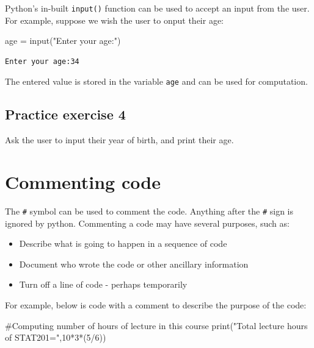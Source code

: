 \documentclass[
  letterpaper,
  DIV=11,
  numbers=noendperiod]{scrreprt}
\newenvironment{Shaded}{\begin{snugshade}}{\end{snugshade}}
\newcommand{\BuiltInTok}[1]{\textcolor[rgb]{0.00,0.23,0.31}{#1}}
\newcommand{\CommentTok}[1]{\textcolor[rgb]{0.37,0.37,0.37}{#1}}
\newcommand{\DecValTok}[1]{\textcolor[rgb]{0.68,0.00,0.00}{#1}}
\newcommand{\NormalTok}[1]{\textcolor[rgb]{0.00,0.23,0.31}{#1}}
\newcommand{\OperatorTok}[1]{\textcolor[rgb]{0.37,0.37,0.37}{#1}}
\newcommand{\StringTok}[1]{\textcolor[rgb]{0.13,0.47,0.30}{#1}}
\begin{document}
Python's in-built \texttt{input()} function can be used to accept an
input from the user. For example, suppose we wish the user to onput
their age:

\begin{Shaded}
\begin{Highlighting}[]
\NormalTok{age }\OperatorTok{=} \BuiltInTok{input}\NormalTok{(}\StringTok{"Enter your age:"}\NormalTok{)}
\end{Highlighting}
\end{Shaded}

\begin{verbatim}
Enter your age:34
\end{verbatim}

The entered value is stored in the variable \texttt{age} and can be used
for computation.

\hypertarget{practice-exercise-4}{%
\subsection{Practice exercise 4}\label{practice-exercise-4}}

Ask the user to input their year of birth, and print their age.

\hypertarget{commenting-code}{%
\section{Commenting code}\label{commenting-code}}

The \texttt{\#} symbol can be used to comment the code. Anything after
the \texttt{\#} sign is ignored by python. Commenting a code may have
several purposes, such as:

\begin{itemize}
\item
  Describe what is going to happen in a sequence of code
\item
  Document who wrote the code or other ancillary information
\item
  Turn off a line of code - perhaps temporarily
\end{itemize}

For example, below is code with a comment to describe the purpose of the
code:

\begin{Shaded}
\begin{Highlighting}[]
\CommentTok{\#Computing number of hours of lecture in this course}
\BuiltInTok{print}\NormalTok{(}\StringTok{"Total lecture hours of STAT201="}\NormalTok{,}\DecValTok{10}\OperatorTok{*}\DecValTok{3}\OperatorTok{*}\NormalTok{(}\DecValTok{5}\OperatorTok{/}\DecValTok{6}\NormalTok{))}
\end{Highlighting}
\end{Shaded}
\end{document}

